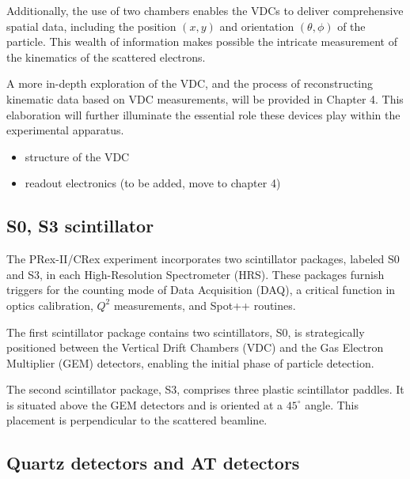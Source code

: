 Additionally, the use of two chambers enables the VDCs to deliver comprehensive spatial data, including the position $(x,y)$ and orientation $(\theta, \phi)$ of the particle. This wealth of information makes possible the intricate measurement of the kinematics of the scattered electrons.

A more in-depth exploration of the VDC, and the process of reconstructing kinematic data based on VDC measurements, will be provided in Chapter 4. This elaboration will further illuminate the essential role these devices play within the experimental apparatus.

\begin{itemize}
    \item structure of the VDC 
    \item readout electronics (to be added, move to chapter 4)
\end{itemize}

\subsection{S0, S3 scintillator}

The PRex-II/CRex experiment incorporates two scintillator packages, labeled S0 and S3, in each High-Resolution Spectrometer (HRS). These packages furnish triggers for the counting mode of Data Acquisition (DAQ), a critical function in optics calibration, $Q^2$ measurements, and Spot++ routines.

The first scintillator package contains two scintillators, S0, is strategically positioned between the Vertical Drift Chambers (VDC) and the Gas Electron Multiplier (GEM) detectors, enabling the initial phase of particle detection.

The second scintillator package, S3, comprises three plastic scintillator paddles. It is situated above the GEM detectors and is oriented at a $45^\circ$ angle. This placement is perpendicular to the scattered beamline. 


\subsection{Quartz detectors and AT detectors}



